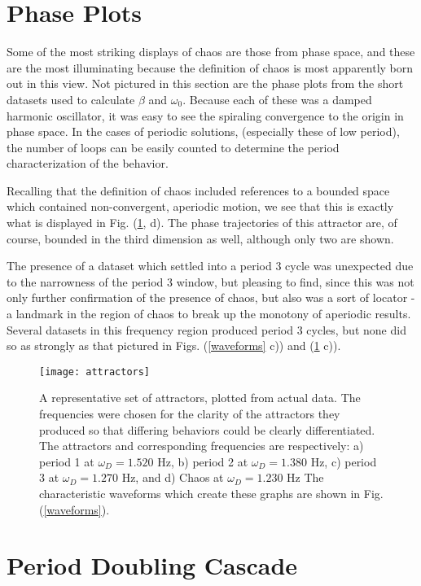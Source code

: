 \documentclass[12pt,twoside]{reedthesis}
\begin{document}
\section{Phase Plots}

Some of the most striking displays of chaos are those from phase space, and these are the most illuminating because the definition of chaos is most apparently born out in this view.  Not pictured in this section are the phase plots from the short datasets used to calculate $\beta$ and $\omega_0$.  Because each of these was a damped harmonic oscillator, it was easy to see the spiraling convergence to the origin in phase space.  In the cases of periodic solutions, (especially these of low period), the number of loops can be easily counted to determine the period characterization of the behavior.  

Recalling that the definition of chaos included references to a bounded space which contained non-convergent, aperiodic motion, we see that this is exactly what is displayed in Fig. (\ref{attractors}, d).  The phase trajectories of this attractor are, of course, bounded in the third dimension as well, although only two are shown.  

The presence of a dataset which settled into a period 3 cycle was unexpected due to the narrowness of the period 3 window, but pleasing to find, since this was not only further confirmation of the presence of chaos, but also was a sort of locator - a landmark in the region of chaos to break up the monotony of aperiodic results.  Several datasets in this frequency region produced period 3 cycles, but none did so as strongly as that pictured in Figs. (\ref{waveforms} c)) and (\ref{attractors} c)).  

\begin{figure}[h]
\centering
\texttt{[image: attractors]} 
\caption{A representative set of attractors, plotted from actual data.  The frequencies were chosen for the clarity of the attractors they produced so that differing behaviors could be clearly differentiated.  The attractors and corresponding frequencies are respectively: a) period 1 at $\omega_D = 1.520$ Hz, b) period 2 at $\omega_D = 1.380$ Hz, c) period 3 at $\omega_D = 1.270$ Hz, and d) Chaos at $\omega_D = 1.230$ Hz  The characteristic waveforms which create these graphs are shown in Fig. (\ref{waveforms}).}
\label{attractors}
\end{figure}



\section{Period Doubling Cascade}
\end{document}
